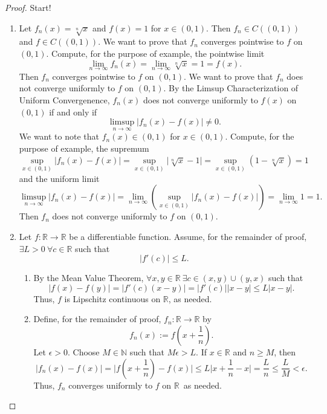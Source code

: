 \documentclass[12pt]{article}
\theoremstyle{definition}
\begin{document}
\begin{proof}
    Start!
    \begin{enumerate}[label=(\alph*)]
        \item Let \(f_n(x) = \sqrt[n]{x}\) and \(f(x) = 1\) for \(x \in (0, 1)\). Then \(f_n \in C((0, 1))\) and \(f \in C((0, 1))\). We want to prove that \(f_n\) converges pointwise to \(f\) on \((0, 1)\). Compute, for the purpose of example, the pointwise limit
        \[
            \lim_{n \to \infty} f_n(x) = \lim_{n \to \infty} \sqrt[n]{x} = 1 = f(x).
        \]
        Then \(f_n\) converges pointwise to \(f\) on \((0, 1)\). We want to prove that \(f_n\) does not converge uniformly to \(f\) on \((0, 1)\). By the Limsup Characterization of Uniform Convergenence, \(f_n(x)\) does not converge uniformly to \(f(x)\) on \((0, 1)\) if and only if
        \[
            \limsup_{n \to \infty} \vert f_n(x) - f(x) \vert \neq 0.
        \]
        We want to note that \(f_n(x) \in (0, 1)\) for \(x \in (0, 1)\). Compute, for the purpose of example, the supremum   
        \[
            \sup_{x \in (0, 1)} \vert f_n(x) - f(x) \vert = \sup_{x \in (0, 1)} \vert \sqrt[n]{x} - 1 \vert = \sup_{x \in (0, 1)}(1 - \sqrt[n]{x}) = 1
        \]
        and the uniform limit
        \[
            \limsup_{n \to \infty} \vert f_n(x) - f(x) \vert = \lim_{n \to \infty}\left( \sup_{x \in (0, 1)} \vert f_n(x) - f(x) \vert \right) = \lim_{n \to \infty} 1 = 1.
        \]
        Then \(f_n\) does not converge uniformly to \(f\) on \((0, 1)\).
        \item Let \(f : \mathbb{R} \to \mathbb{R}\) be a differentiable function. Assume, for the remainder of proof, \(\exists L > 0 \ \forall c \in \mathbb{R}\) such that
        \[
            \vert f'(c) \vert \leq L.
        \]
        \begin{enumerate}[label=(\roman*)]
            \item By the Mean Value Theorem, \(\forall x, y \in \mathbb{R} \ \exists c \in (x, y) \cup (y, x)\) such that
            \[
                \vert f(x) - f(y) \vert = \vert f'(c)(x - y) \vert = \vert f'(c) \vert \vert x - y \vert \leq L \vert x - y \vert. 
            \]
            Thus, \(f\) is Lipschitz continuous on \(\mathbb{R}\), as needed.
            \item Define, for the remainder of proof, \(f_n : \mathbb{R} \to \mathbb{R}\) by 
            \[
                f_n(x) := f\left(x + \frac{1}{n}\right).
            \]
            Let \(\epsilon > 0\). Choose \(M \in \mathbb{N}\) such that \(M\epsilon > L\). If \(x \in \mathbb{R}\) and \(n \geq M\), then
            \[
                \vert f_n(x) - f(x) \vert = \bigg\vert f\left(x + \frac{1}{n}\right) - f(x) \bigg\vert \leq L \bigg\vert x + \frac{1}{n} - x\bigg\vert = \frac{L}{n} \leq \frac{L}{M} < \epsilon.
            \]
            Thus, \(f_n\) converges uniformly to \(f\) on \(\mathbb{R}\)\, as needed.
        \end{enumerate}
    \end{enumerate}
\end{proof}
\end{document}
